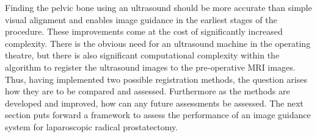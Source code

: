 Finding the pelvic bone using an ultrasound should be more accurate than 
simple visual alignment and enables image guidance in the earliest stages of the 
procedure. These improvements come at the cost of significantly increased complexity. 
There is the obvious need for an ultrasound machine in the operating theatre, but there is 
also significant computational complexity within the algorithm to register the ultrasound
images to the pre-operative MRI images. Thus, having implemented two possible registration 
methods, the question arises how they are to be compared and assessed. Furthermore as the
methods are developed and improved, how can any future assessments be assessed. The next section 
puts forward a framework to assess the performance of an image guidance system for 
laparoscopic radical prostatectomy.  








